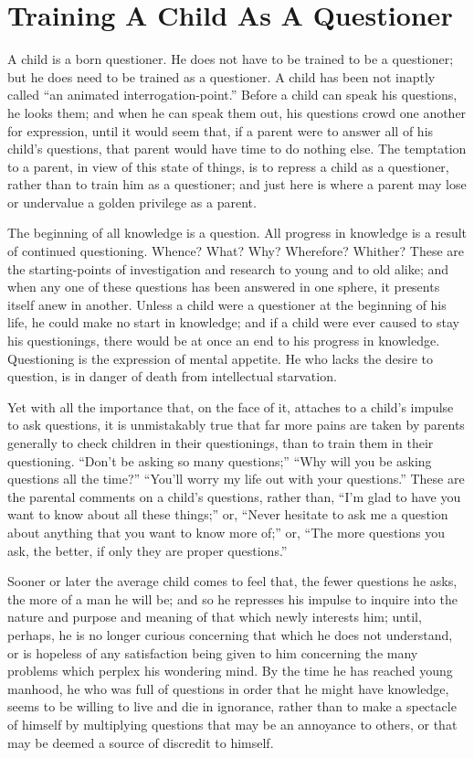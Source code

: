 \documentclass[
]{book}
\begin{document}
\hypertarget{training-a-child-as-a-questioner}{%
\chapter{Training A Child As A Questioner}\label{training-a-child-as-a-questioner}}

A child is a born questioner. He does not have to be trained to be a questioner; but he does need to be trained as a questioner. A child has been not inaptly called ``an animated interrogation-point.'' Before a child can speak his questions, he looks them; and when he can speak them out, his questions crowd one another for expression, until it would seem that, if a parent were to answer all of his child's questions, that parent would have time to do nothing else. The temptation to a parent, in view of this state of things, is to repress a child as a questioner, rather than to train him as a questioner; and just here is where a parent may lose or undervalue a golden privilege as a parent.

The beginning of all knowledge is a question. All progress in knowledge is a result of continued questioning. Whence? What? Why? Wherefore? Whither? These are the starting-points of investigation and research to young and to old alike; and when any one of these questions has been answered in one sphere, it presents itself anew in another. Unless a child were a questioner at the beginning of his life, he could make no start in knowledge; and if a child were ever caused to stay his questionings, there would be at once an end to his progress in knowledge. Questioning is the expression of mental appetite. He who lacks the desire to question, is in danger of death from intellectual starvation.

Yet with all the importance that, on the face of it, attaches to a child's impulse to ask questions, it is unmistakably true that far more pains are taken by parents generally to check children in their questionings, than to train them in their questioning. ``Don't be asking so many questions;'' ``Why will you be asking questions all the time?'' ``You'll worry my life out with your questions.'' These are the parental comments on a child's questions, rather than, ``I'm glad to have you want to know about all these things;'' or, ``Never hesitate to ask me a question about anything that you want to know more of;'' or, ``The more questions you ask, the better, if only they are proper questions.''

Sooner or later the average child comes to feel that, the fewer questions he asks, the more of a man he will be; and so he represses his impulse to inquire into the nature and purpose and meaning of that which newly interests him; until, perhaps, he is no longer curious concerning that which he does not understand, or is hopeless of any satisfaction being given to him concerning the many problems which perplex his wondering mind. By the time he has reached young manhood, he who was full of questions in order that he might have knowledge, seems to be willing to live and die in ignorance, rather than to make a spectacle of himself by multiplying questions that may be an annoyance to others, or that may be deemed a source of discredit to himself.
\end{document}
